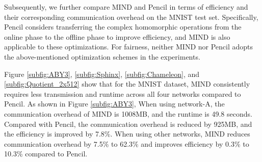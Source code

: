 \documentclass[conference]{IEEEtran}
\begin{document}





Subsequently, we further compare MIND and Pencil in terms of efficiency and their corresponding communication overhead on the MNIST test set.
Specifically, Pencil \cite{liu2024pencilprivateextensiblecollaborative} considers transferring the complex homomorphic operations from the online phase to the offline phase to improve efficiency, and MIND is also applicable to these optimizations.
For fairness, neither MIND nor Pencil adopts the above-mentioned optimization schemes in the experiments.









 



Figure \ref{subfig:ABY3}, \ref{subfig:Sphinx}, \ref{subfig:Chameleon}, and \ref{subfig:Quotient_2x512} show that for the MNIST dataset, MIND consistently requires less transmission and runtime across all four networks compared to Pencil.
As shown in Figure \ref{subfig:ABY3}, When using network-A, the communication overhead of MIND is 1008MB, and the runtime is 49.8 seconds. Compared with Pencil, the communication overhead is reduced by 925MB, and the efficiency is improved by 7.8\%. When using other networks, MIND reduces communication overhead by 7.5\% to 62.3\% and improves efficiency by 0.3\% to 10.3\% compared to Pencil.
\end{document}
